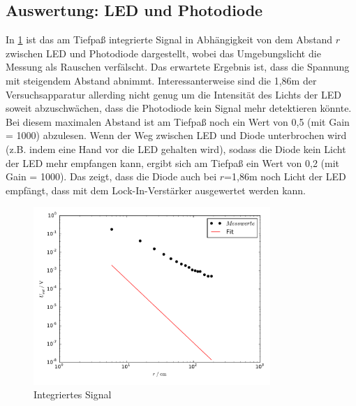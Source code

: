 \newpage

\captionsetup{labelformat=default}

\subsection{Auswertung: LED und Photodiode}



In \ref{fig:plot4} ist das am Tiefpaß integrierte Signal in Abhängigkeit von
dem Abstand $r$ zwischen LED und Photodiode dargestellt, wobei das Umgebungslicht
die Messung als Rauschen verfälscht. Das erwartete Ergebnis
ist, dass die Spannung mit steigendem Abstand abnimmt. Interessanterweise
sind die 1,86m der Versuchsapparatur allerding nicht genug um die Intensität
des Lichts der LED soweit abzuschwächen, dass die Photodiode kein Signal
mehr detektieren könnte. Bei diesem maximalen Abstand ist am Tiefpaß noch ein
Wert von 0,5 (mit Gain = 1000) abzulesen. Wenn der Weg zwischen LED und
Diode unterbrochen wird (z.B. indem eine Hand vor die LED gehalten wird),
sodass die Diode kein Licht der LED mehr empfangen kann, ergibt sich am
Tiefpaß ein Wert von 0,2 (mit Gain = 1000). Das zeigt, dass die Diode auch
bei $r$=1,86m noch Licht der LED empfängt, dass mit dem Lock-In-Verstärker
ausgewertet werden kann.
\begin{figure}
  \centering
  \includegraphics[width=0.8\textwidth, height=0.5\textwidth]{plot4.pdf}
  \caption{Integriertes Signal}
  \label{fig:plot4}
\end{figure}
